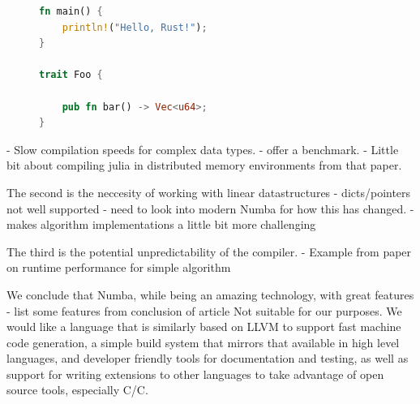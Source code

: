 \begin{figure}[h]
    \centering
    \begin{lstlisting}[language=Rust, caption=Your Rust code caption., label=code:rust_label]
fn main() {
    println!("Hello, Rust!");
}

trait Foo {

    pub fn bar() -> Vec<u64>;
}
    \end{lstlisting}
\end{figure}

- Slow compilation speeds for complex data types.
    - offer a benchmark.
- Little bit about compiling julia in distributed memory environments from that paper.

The second is the neccesity of working with linear datastructures
- dicts/pointers not well supported
    - need to look into modern Numba for how this has changed.
- makes algorithm implementations a little bit more challenging

The third is the potential unpredictability of the compiler.
    - Example from paper on runtime performance for simple algorithm

We conclude that Numba, while being an amazing technology, with great features
    - list some features from conclusion of article
Not suitable for our purposes. We would like a language that is similarly based on LLVM
to support fast machine code generation, a simple build system that mirrors that available
in high level languages, and developer friendly tools for documentation and testing, as well
as support for writing extensions to other languages to take advantage of open source tools, especially C/C\+\+.

